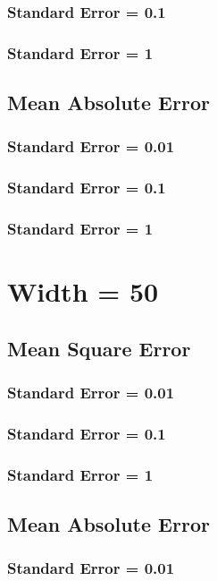 \documentclass[12pt]{article}
\theoremstyle{remark}
\begin{document}
			
			\subsubsection{Standard Error = 0.1}
			\subsubsection{Standard Error = 1}
		\subsection{Mean Absolute Error}
			\subsubsection{Standard Error = 0.01}
			\subsubsection{Standard Error = 0.1}
			\subsubsection{Standard Error = 1}

	\section{Width = 50}
		\subsection{Mean Square Error}
			\subsubsection{Standard Error = 0.01}
			\subsubsection{Standard Error = 0.1}
			\subsubsection{Standard Error = 1}
		\subsection{Mean Absolute Error}
			\subsubsection{Standard Error = 0.01}
\end{document}
